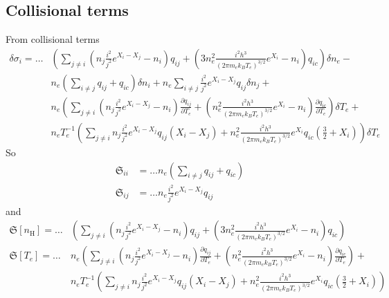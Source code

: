 \documentclass{article}
\begin{document}
\subsection{Collisional terms}
From collisional terms
\begin{equation}
    \begin{aligned}
        \delta\sigma_i = \ldots &\left(\sum\limits_{j \neq i}\left(n_j\frac{i^2}{j^2}e^{X_i-X_j}-n_i\right)q_{ij}  + \left(3n_e^2\frac{i^2h^3}{(2\pi m_ek_BT_e)^{3/2}}e^{X_i}-n_i\right)q_{ic}\right)\delta n_e - \\
        & n_e\left(\sum\limits_{i \neq j}q_{ij} + q_{ic}\right)\delta n_i + n_e \sum\limits_{i\neq j}\frac{i^2}{j^2}e^{X_i-X_j}q_{ij}\delta n_j + \\
        & n_e\left(\sum\limits_{j \neq i}\left(n_j\frac{i^2}{j^2}e^{X_i-X_j}-n_i\right)\frac{\partial q_{ij}}{\partial T_e}  + \left(n_e^2\frac{i^2h^3}{(2\pi m_ek_BT_e)^{3/2}}e^{X_i}-n_i\right)\frac{\partial q_{ic}}{\partial T_e}\right)\delta T_e + \\
        & n_eT_e^{-1}\left(\sum\limits_{j \neq i}n_j\frac{i^2}{j^2}e^{X_i-X_j}q_{ij}(X_i - X_j) + n_e^2\frac{i^2h^3}{(2\pi m_ek_BT_e)^{3/2}}e^{X_i}q_{ic}\left(\frac{3}{2} + X_i\right)\right)\delta T_e 
    \end{aligned}
\end{equation}
So
\begin{equation}
    \begin{aligned}
        \mathfrak{S}_{ii} &= \ldots n_e\left(\sum\limits_{i \neq j}q_{ij} + q_{ic}\right)\\
        \mathfrak{S}_{ij} &= \ldots n_e\frac{i^2}{j^2}e^{X_i-X_j}q_{ij}
    \end{aligned}
\end{equation}
and
\begin{equation}
    \begin{aligned}
        \mathfrak{S}[n_\mathrm{H}] = \ldots& \left(\sum\limits_{j \neq i}\left(n_j\frac{i^2}{j^2}e^{X_i-X_j}-n_i\right)q_{ij}  + \left(3n_e^2\frac{i^2h^3}{(2\pi m_ek_BT_e)^{3/2}}e^{X_i}-n_i\right)q_{ic}\right) \\
        \mathfrak{S}[T_e] = \ldots & n_e\left(\sum\limits_{j \neq i}\left(n_j\frac{i^2}{j^2}e^{X_i-X_j}-n_i\right)\frac{\partial q_{ij}}{\partial T_e}  + \left(n_e^2\frac{i^2h^3}{(2\pi m_ek_BT_e)^{3/2}}e^{X_i}-n_i\right)\frac{\partial q_{ic}}{\partial T_e}\right) + \\
        & n_eT_e^{-1}\left(\sum\limits_{j \neq i}n_j\frac{i^2}{j^2}e^{X_i-X_j}q_{ij}(X_i - X_j) + n_e^2\frac{i^2h^3}{(2\pi m_ek_BT_e)^{3/2}}e^{X_i}q_{ic}\left(\frac{3}{2} + X_i\right)\right)
    \end{aligned}
\end{equation}
\newpage
\end{document}
